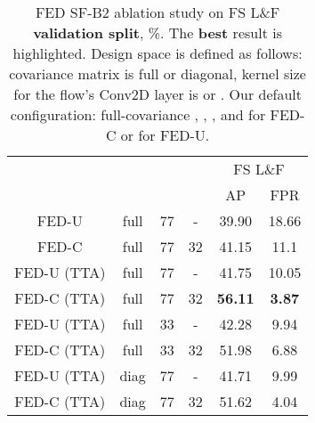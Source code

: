 \documentclass[accepted, startpage]{uai2023}
\begin{document}
\begin{table}[t]
	\caption{FED SF-B2 ablation study on FS L\&F \textbf{validation split}, \%. The \textbf{best} result is highlighted. Design space is defined as follows: covariance matrix  is full or diagonal, kernel size  for the flow's Conv2D layer is  or . Our default configuration: full-covariance , , , and  for FED-C or  for FED-U.}
	\label{tab:fishyscapes-ablation}
	\centering
	\small
	\begin{tabular}{c|c|c|c|cc}
		\toprule
		\multirow{2}{*}{\shortstack{Method}} & \multirow{2}{*}{\shortstack{}} & \multirow{2}{*}{\shortstack{}} & \multirow{2}{*}{\shortstack{}} & \multicolumn{2}{|c}{FS L\&F}\\
		&  &  &  & AP & FPR \\
		\midrule
		FED-U       & full & 77  &  -  &          39.90 &           18.66\\
		FED-C       & full & 77  &  32 &          41.15 &           11.1 \\
		FED-U (TTA) & full & 77  &  -  &          41.75 &           10.05\\
		FED-C (TTA) & full & 77  &  32 & \textbf{56.11} &    \textbf{3.87} \\
		FED-U (TTA) & full & 33  &  -  &          42.28 &           9.94 \\
		FED-C (TTA) & full & 33  &  32 &          51.98 &           6.88 \\
		FED-U (TTA) & diag & 77  &  -  &          41.71 &           9.99 \\
		FED-C (TTA) & diag & 77  &  32 &          51.62 &           4.04 \\
		\bottomrule
	\end{tabular}
\end{table}
\end{document}
